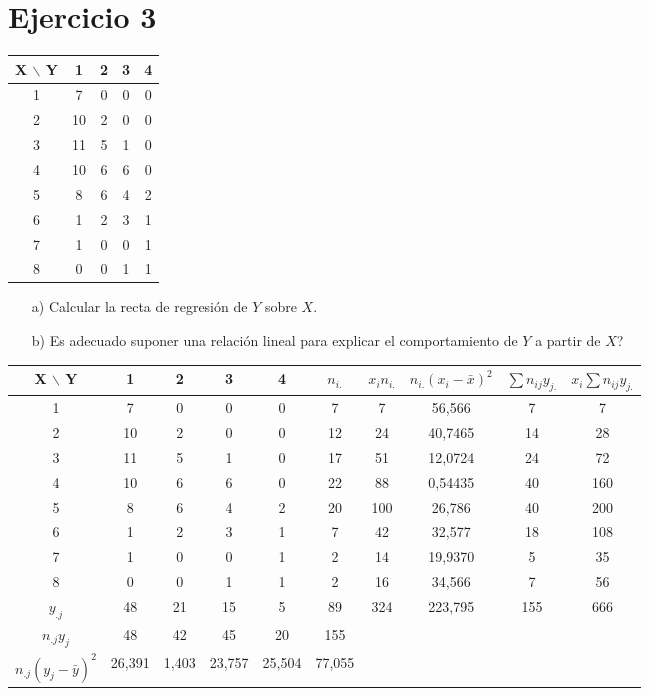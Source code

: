 \documentclass[a4paper,12pt]{article}
\begin{document}
\section*{Ejercicio 3}
\begin{center}
\begin{tabular}{c|cccc}
X $\backslash$ Y & 1 & 2 & 3 & 4 \\
\hline
1 & 7 & 0 & 0 & 0 \\
2 & 10 & 2 & 0 & 0 \\
3 & 11 & 5 & 1 & 0 \\
4 & 10 & 6 & 6 & 0 \\
5 & 8 & 6 & 4 & 2 \\
6 & 1 & 2 & 3 & 1 \\
7 & 1 & 0 & 0 & 1 \\
8 & 0 & 0 & 1 & 1 \\
\end{tabular}
\end{center}

\begin{enumerate}
    \item[a)] Calcular la recta de regresi\'on de $Y$ sobre $X$.
    \item[b)] \textquestiondown Es adecuado suponer una relaci\'on lineal para explicar el comportamiento de $Y$ a partir de $X$?
\end{enumerate}

\begin{center}
\begin{tabular}{c|cccc|c||c|c|c|c}

X $\backslash$ Y & 1 & 2 & 3 & 4 & $n_{i.}$ & $x_in_{i.}$ & $n_{i.}(x_i-\bar x)^2$ & $\sum n_{ij} y_{j.}$ & $x_i\sum n_{ij} y_{j.}$ \\
\hline
1 & 7 & 0 & 0 & 0 &7&7&56,566&7&7\\
2 & 10 & 2 & 0 & 0 &12&24&40,7465&14&28\\
3 & 11 & 5 & 1 & 0 & 17&51&12,0724&24&72\\
4 & 10 & 6 & 6 & 0 &22&88&0,54435&40&160\\
5 & 8 & 6 & 4 & 2 &20&100&26,786&40&200\\
6 & 1 & 2 & 3 & 1 &7&42&32,577&18&108\\
7 & 1 & 0 & 0 & 1 &2&14&19,9370&5&35\\
8 & 0 & 0 & 1 & 1 &2&16&34,566&7&56\\
\hline 
$y_{.j}$ & 48 & 21 & 15 &5&89&324&223,795&155&666\\
\hline
$n_{.j}y_j$ & 48 & 42 &45&20 & 155\\
\hline
$n_{.j}(y_j - \bar y)^2$ & 26,391 & 1,403 & 23,757 & 25,504 &77,055\\
\end{tabular}

\end{center}
\end{document}

